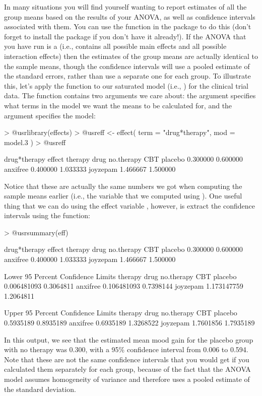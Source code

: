 In many situations you will find yourself wanting to report estimates of all the group means based on the results of your ANOVA, as well as confidence intervals associated with them. You can use the  function in the  package to do this (don't forget to install the package if you don't have it already!). If the ANOVA that you have run is a  (i.e., contains all possible main effects and all possible interaction effects) then the estimates of the group means are actually identical to the sample means, though the confidence intervals will use a pooled estimate of the standard errors, rather than use a separate one for each group. To illustrate this, let's apply the  function to our saturated model (i.e., ) for the clinical trial data. The  function contains two arguments we care about: the  argument specifies what terms in the model we want the means to be calculated for, and the  argument specifies the model:
\begin{rblock1}
> @usr{library(effects)}
> @usr{eff <- effect( term = "drug*therapy", mod = model.3 )}
> @usr{eff}

 drug*therapy effect
          therapy
drug       no.therapy      CBT
  placebo    0.300000 0.600000
  anxifree   0.400000 1.033333
  joyzepam   1.466667 1.500000
\end{rblock1}
Notice that these are actually the same numbers we got when computing the sample means earlier (i.e., the  variable that we computed using ). One useful thing that we can do using the effect variable , however, is extract the confidence intervals using the  function:
\begin{rblock1}
> @usr{summary(eff)}

 drug*therapy effect
          therapy
drug       no.therapy      CBT
  placebo    0.300000 0.600000
  anxifree   0.400000 1.033333
  joyzepam   1.466667 1.500000

 Lower 95 Percent Confidence Limits
          therapy
drug        no.therapy       CBT
  placebo  0.006481093 0.3064811
  anxifree 0.106481093 0.7398144
  joyzepam 1.173147759 1.2064811

 Upper 95 Percent Confidence Limits
          therapy
drug       no.therapy       CBT
  placebo   0.5935189 0.8935189
  anxifree  0.6935189 1.3268522
  joyzepam  1.7601856 1.7935189
\end{rblock1}
In this output, we see that the estimated mean mood gain for the placebo group with no therapy was 0.300, with a 95\% confidence interval from 0.006 to 0.594. Note that these are not the same confidence intervals that you would get if you calculated them separately for each group, because of the fact that the ANOVA model assumes homogeneity of variance and therefore uses a pooled estimate of the standard deviation. 

